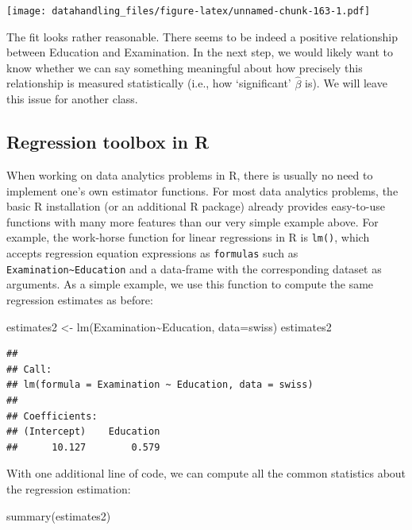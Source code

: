 \documentclass[
  12pt,
]{style/krantz}
\newenvironment{Shaded}{\begin{snugshade}}{\end{snugshade}}
\newcommand{\AttributeTok}[1]{\textcolor[rgb]{0.77,0.63,0.00}{#1}}
\newcommand{\FunctionTok}[1]{\textcolor[rgb]{0.00,0.00,0.00}{#1}}
\newcommand{\NormalTok}[1]{#1}
\newcommand{\OtherTok}[1]{\textcolor[rgb]{0.56,0.35,0.01}{#1}}
\newcommand{\SpecialCharTok}[1]{\textcolor[rgb]{0.00,0.00,0.00}{#1}}
\begin{document}
\texttt{[image: datahandling\_files/figure-latex/unnamed-chunk-163-1.pdf]}

The fit looks rather reasonable. There seems to be indeed a positive relationship between Education and Examination. In the next step, we would likely want to know whether we can say something meaningful about how precisely this relationship is measured statistically (i.e., how `significant' \(\hat{\beta}\) is). We will leave this issue for another class.

\hypertarget{regression-toolbox-in-r}{%
\subsection{Regression toolbox in R}\label{regression-toolbox-in-r}}

When working on data analytics problems in R, there is usually no need to implement one's own estimator functions. For most data analytics problems, the basic R installation (or an additional R package) already provides easy-to-use functions with many more features than our very simple example above. For example, the work-horse function for linear regressions in R is \texttt{lm()}, which accepts regression equation expressions as \texttt{formulas} such as \texttt{Examination\textasciitilde{}Education} and a data-frame with the corresponding dataset as arguments. As a simple example, we use this function to compute the same regression estimates as before:

\begin{Shaded}
\begin{Highlighting}[]
\NormalTok{estimates2 }\OtherTok{\textless{}{-}} \FunctionTok{lm}\NormalTok{(Examination}\SpecialCharTok{\textasciitilde{}}\NormalTok{Education, }\AttributeTok{data=}\NormalTok{swiss)}
\NormalTok{estimates2}
\end{Highlighting}
\end{Shaded}

\begin{verbatim}
## 
## Call:
## lm(formula = Examination ~ Education, data = swiss)
## 
## Coefficients:
## (Intercept)    Education  
##      10.127        0.579
\end{verbatim}

With one additional line of code, we can compute all the common statistics about the regression estimation:

\begin{Shaded}
\begin{Highlighting}[]
\FunctionTok{summary}\NormalTok{(estimates2)}
\end{Highlighting}
\end{Shaded}
\end{document}
